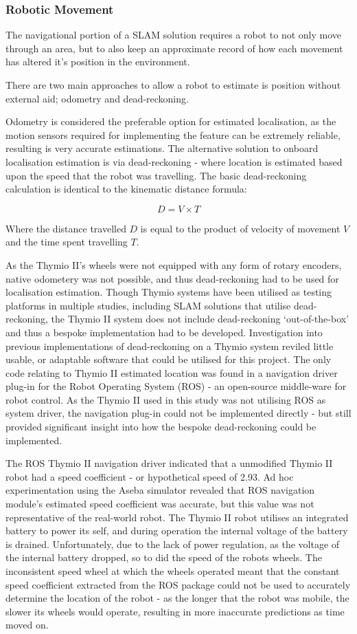 \subsubsection{Robotic Movement}
The navigational portion of a SLAM solution requires a robot to not only move
through an area, but to also keep an approximate record of how each movement
has altered it's position in the environment.

There are two main approaches to allow a robot to estimate is position
without external aid; odometry and dead-reckoning.

Odometry is considered the preferable option for estimated localisation, as
the motion sensors required for implementing the feature can be extremely
reliable, resulting is very accurate estimations.
The alternative solution to onboard localisation estimation is via
dead-reckoning - where location is estimated based upon the speed that the
robot was travelling.
The basic dead-reckoning calculation is identical to the kinematic
distance formula:

\[ D = V \times T \]

Where the distance travelled \(D\) is equal to the product of velocity of
movement \(V\) and the time spent travelling \(T\).

As the Thymio II's wheels were not equipped with any form of rotary encoders,
native odometery was not possible, and thus dead-reckoning had to be used for
localisation estimation.
Though Thymio systems have been utilised as testing platforms in multiple
studies, including SLAM solutions that utilise dead-reckoning, the Thymio II
system does not include dead-reckoning `out-of-the-box' and thus a bespoke
implementation had to be developed.
Investigation into previous implementations of dead-reckoning on a Thymio
system reviled little usable, or adaptable software that could be utilised for
this project.
The only code relating to Thymio II estimated location was found in a
navigation driver plug-in for the Robot Operating System (ROS) - an open-source
middle-ware for robot control.
As the Thymio II used in this study was not utilising ROS as system driver,
the navigation plug-in could not be implemented directly - but still provided
significant insight into how the bespoke dead-reckoning could be implemented.

The ROS Thymio II navigation driver indicated that a unmodified Thymio II
robot had a speed coefficient - or hypothetical speed of 2.93.
Ad hoc experimentation using the Aseba simulator revealed that ROS navigation
module's estimated speed coefficient was accurate, but this value was not
representative of the real-world robot.
The Thymio II robot utilises an integrated battery to power its self, and
during operation the internal voltage of the battery is drained.
Unfortunately, due to the lack of power regulation, as the voltage of the
internal battery dropped, so to did the speed of the robots wheels.
The inconsistent speed wheel at which the wheels operated meant that the
constant speed coefficient extracted from the ROS package could not be used to
accurately determine the location of the robot - as the longer that the robot
was mobile, the slower its wheels would operate, resulting in more inaccurate
predictions as time moved on.


